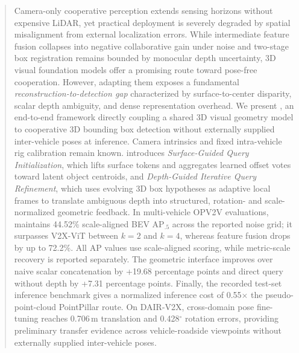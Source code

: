 \begin{abstract}
Camera-only cooperative perception extends sensing horizons without expensive LiDAR, yet practical deployment is severely degraded by spatial misalignment from external localization errors. While intermediate feature fusion collapses into negative collaborative gain under noise and two-stage box registration remains bounded by monocular depth uncertainty, 3D visual foundation models offer a promising route toward pose-free cooperation. However, adapting them exposes a fundamental \emph{reconstruction-to-detection gap} characterized by surface-to-center disparity, scalar depth ambiguity, and dense representation overhead. We present \method{}, an end-to-end framework directly coupling a shared 3D visual geometry model to cooperative 3D bounding box detection without externally supplied inter-vehicle poses at inference. Camera intrinsics and fixed intra-vehicle rig calibration remain known. \method{} introduces \emph{Surface-Guided Query Initialization}, which lifts surface tokens and aggregates learned offset votes toward latent object centroids, and \emph{Depth-Guided Iterative Query Refinement}, which uses evolving 3D box hypotheses as adaptive local frames to translate ambiguous depth into structured, rotation- and scale-normalized geometric feedback. In multi-vehicle OPV2V evaluations, \method{} maintains 44.52\% scale-aligned BEV $\text{AP}_{.5}$ across the reported noise grid; it surpasses V2X-ViT between $k=2$ and $k=4$, whereas feature fusion drops by up to 72.2\%. All AP values use scale-aligned scoring, while metric-scale recovery is reported separately. The geometric interface improves over naive scalar concatenation by +19.68 percentage points and direct query without depth by +7.31 percentage points. Finally, the recorded test-set inference benchmark gives \method{} a normalized inference cost of 0.55$\times$ the pseudo-point-cloud PointPillar route. On DAIR-V2X, cross-domain pose fine-tuning reaches 0.706\,m translation and 0.428$^\circ$ rotation errors, providing preliminary transfer evidence across vehicle-roadside viewpoints without externally supplied inter-vehicle poses.
\end{abstract}
